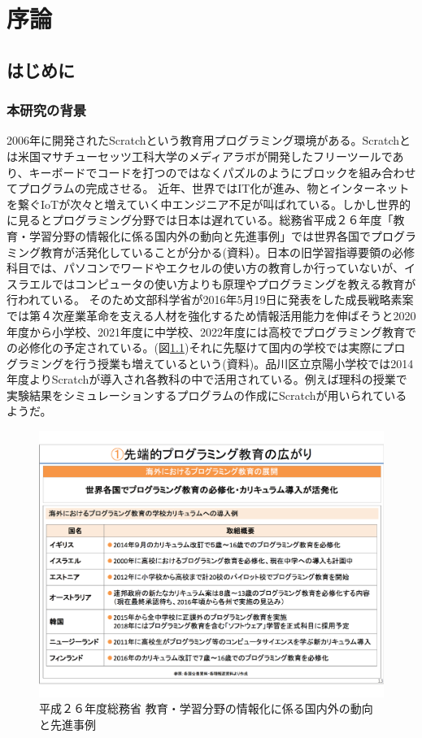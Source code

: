 \documentclass[a4paper,10pt,onecolumn,oneside,openany]{jsbook}
\begin{document}
\tableofcontents

\mainmatter

\part{序論} 
\chapter{はじめに}
\section{本研究の背景}
2006年に開発されたScratchという教育用プログラミング環境がある。Scratchとは米国マサチューセッツ工科大学のメディアラボが開発したフリーツールであり、キーボードでコードを打つのではなくパズルのようにブロックを組み合わせてプログラムの完成させる。
近年、世界ではIT化が進み、物とインターネットを繋ぐIoTが次々と増えていく中エンジニア不足が叫ばれている。しかし世界的に見るとプログラミング分野では日本は遅れている。総務省平成２６年度「教育・学習分野の情報化に係る国内外の動向と先進事例」では世界各国でプログラミング教育が活発化していることが分かる(資料\cite{itedu}）。日本の旧学習指導要領の必修科目では、パソコンでワードやエクセルの使い方の教育しか行っていないが、イスラエルではコンピュータの使い方よりも原理やプログラミングを教える教育が行われている。
そのため文部科学省が2016年5月19日に発表をした成長戦略素案では第４次産業革命を支える人材を強化するため情報活用能力を伸ばそうと2020年度から小学校、2021年度に中学校、2022年度には高校でプログラミング教育での必修化の予定されている。(図\ref{itedu})それに先駆けて国内の学校では実際にプログラミングを行う授業も増えているという(資料\cite{edu_prog})。品川区立京陽小学校では2014年度よりScratchが導入され各教科の中で活用されている。例えば理科の授業で実験結果をシミュレーションするプログラムの作成にScratchが用いられているようだ。
\begin{figure}[h]
  \centering
    \includegraphics[scale=0.4]{graphic/foreign_data.pdf}
  \caption{平成２６年度総務省 教育・学習分野の情報化に係る国内外の動向と先進事例}
  \label{itedu}
 \end{figure}
 
\end{document}

